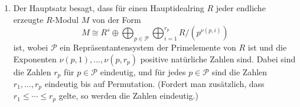 \begin{solution}
  \begin{enumerate}
    \item
      Der Hauptsatz besagt, dass für einen Hauptidealring $R$ jeder endliche erzeugte $R$-Modul $M$ von der Form
      \[
        M \cong R^s \oplus \bigoplus_{p \in \mathcal{P}} \bigoplus_{i=1}^{r_p} R/(p^{\nu(p,i)})
      \]
      ist, wobei $\mathcal{P}$ ein Repräsentantensystem der Primelemente von $R$ ist und die Exponenten $\nu(p,1), \dotsc, \nu(p,r_p)$ positive natürliche Zahlen sind.
      Dabei sind die Zahlen $r_p$ für $p \in \mathcal{P}$ eindeutig, und für jedes $p \in \mathcal{P}$ sind die Zahlen $r_1, \dotsc, r_p$ eindeutig bis auf Permutation.
      (Fordert man zusätzlich, dass $r_1 \leq \dotsb \leq r_p$ gelte, so werden die Zahlen eindeutig.)
    

\end{enumerate}
\end{solution}
